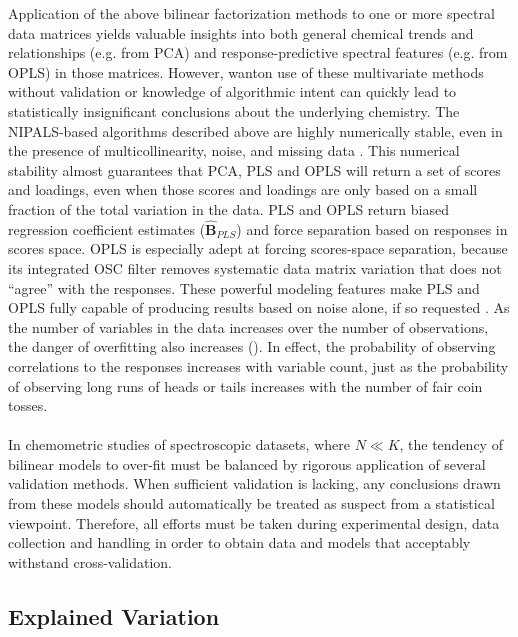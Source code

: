 \begin{doublespace}
Application of the above bilinear factorization methods to one or more
spectral data matrices yields valuable insights into both general chemical
trends and relationships (e.g. from PCA) and response-predictive spectral
features (e.g. from OPLS) in those matrices. However, wanton use of these
multivariate methods without validation or knowledge of algorithmic intent
can quickly lead to statistically insignificant conclusions about the
underlying chemistry. The NIPALS-based algorithms described above are
highly numerically stable, even in the presence of multicollinearity,
noise, and missing data \cite{wold:cils2001,andersson:jchemo2009}. This
numerical stability almost guarantees that PCA, PLS and OPLS will return
a set of scores and loadings, even when those scores and loadings are only
based on a small fraction of the total variation in the data. PLS and OPLS
return biased regression coefficient estimates ($\hat{\mathbf{B}}_{PLS}$)
and force separation based on responses in scores space. OPLS is especially
adept at forcing scores-space separation, because its integrated OSC filter
removes systematic data matrix variation that does not ``agree'' with the
responses. These powerful modeling features make PLS and OPLS fully capable
of producing results based on noise alone, if so requested
\cite{westerhuis:metab2008a}. As the number of variables in the data increases
over the number of observations, the danger of overfitting also increases
(). In effect, the probability of observing
correlations to the responses increases with variable count, just as the
probability of observing long runs of heads or tails increases with the number
of fair coin tosses.
\\\\
In chemometric studies of spectroscopic datasets, where $N \ll K$, the tendency
of bilinear models to over-fit must be balanced by rigorous application of
several validation methods. When sufficient validation is lacking, any
conclusions drawn from these models should automatically be treated as
suspect from a statistical viewpoint. Therefore, all efforts must be taken
during experimental design, data collection and handling in order to obtain
data and models that acceptably withstand cross-validation.
\end{doublespace}

\subsection{Explained Variation}

